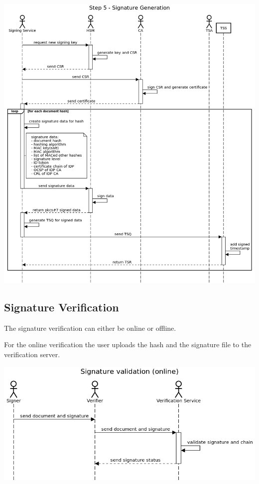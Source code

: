 \includegraphics[scale=0.45]{images/protocol_step5_signature_generation.png}

\subsection{Signature Verification}

The signature verification can either be online or offline.

For the online verification the user uploads the hash and the signature file to the verification server.

\includegraphics[scale=0.5]{images/protocol_online_verification_high_level.png}

